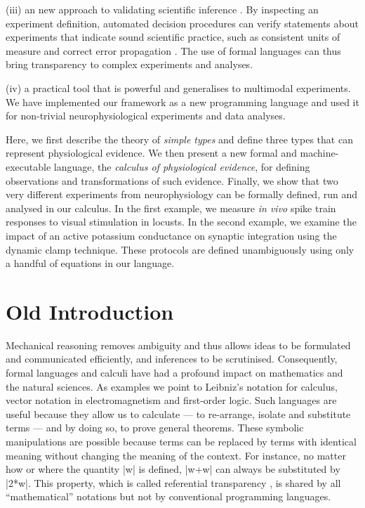 (iii) an new approach to validating scientific inference
\citep{Editors2003}. By inspecting an experiment definition, automated
decision procedures can verify statements about experiments that
indicate sound scientific practice, such as consistent units of
measure \citep{Kennedy1997} and correct error propagation
\citep{Taylor1997}. The use of formal languages can thus bring
transparency to complex experiments and analyses.

(iv) a practical tool that is powerful and generalises to multimodal
experiments. We have implemented our framework as a new programming
language and used it for non-trivial neurophysiological experiments
and data analyses.

Here, we first describe the theory of \emph{simple types}
\citep{Pierce2002} and define three types that can represent
physiological evidence. We then present a new formal and
machine-executable language, the \emph{calculus of physiological
  evidence}, for defining observations and transformations of such
evidence. Finally, we show that two very different experiments from
neurophysiology can be formally defined, run and analysed in our
calculus. In the first example, we measure \emph{in vivo} spike train
responses to visual stimulation in locusts. In the second example, we
examine the impact of an active potassium conductance on synaptic
integration using the dynamic clamp technique. These protocols are
defined unambiguously using only a handful of equations in our
language.

\section*{Old Introduction}

Mechanical reasoning removes ambiguity and thus allows ideas to be
formulated and communicated efficiently, and inferences to be
scrutinised. Consequently, formal languages and calculi have had a
profound impact on mathematics and the natural sciences. As examples
we point to Leibniz's notation for calculus, vector notation in
electromagnetism and first-order logic. Such languages are useful
because they allow us to calculate --- to re-arrange, isolate and
substitute terms --- and by doing so, to prove general theorems. These
symbolic manipulations are possible because terms can be replaced by
terms with identical meaning without changing the meaning of the
context. For instance, no matter how or where the quantity |w| is
defined, |w+w| can always be substituted by |2*w|. This property,
which is called referential transparency \citep{Whitehead1927}, is
shared by all ``mathematical'' notations but not by conventional
programming languages.


